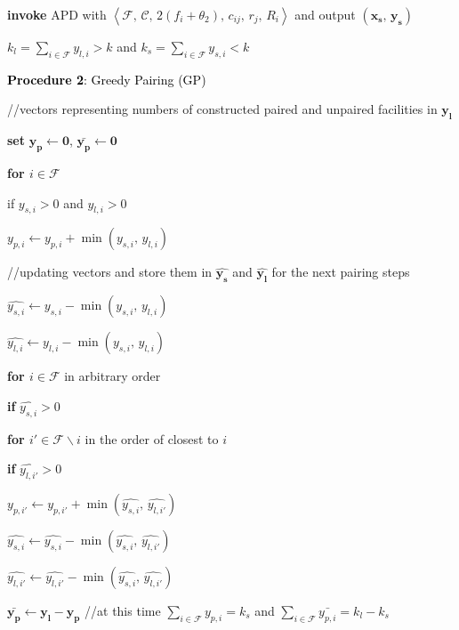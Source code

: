 \documentclass[10pt]{llncs}
\begin{document}
\begin{algorithm}
\textbf{invoke} APD with $\left\langle \mathcal{F},\,\mathcal{C},\,2\left(f_{i}+\theta_{2}\right),\, c_{ij},\, r_{j},\, R_{i}\right\rangle $
and output $\left(\boldsymbol{x_{s}},\,\boldsymbol{y_{s}}\right)$

$k_{l}=\sum_{i\in\mathcal{F}}y_{l,i}>k$ and $k_{s}=\sum_{i\in\mathcal{F}}y_{s,i}<k$

\medskip{}


\textbf{\textcolor{black}{Procedure 2}}\textcolor{black}{: Greedy
Pairing (GP)}

//vectors representing numbers of constructed paired and unpaired
facilities in $\boldsymbol{y_{l}}$

\textbf{set} $\boldsymbol{y_{p}}\leftarrow\boldsymbol{0}$, $\boldsymbol{\bar{y_{p}}}\leftarrow\boldsymbol{0}$ 

\textbf{for $i\in\mathcal{F}$}

\qquad{}if $y_{s,i}>0$ and $y_{l,i}>0$

\qquad{}\qquad{}$y_{p,i}\leftarrow y_{p,i}+\min\left(y_{s,i},\, y_{l,i}\right)$

\qquad{}\qquad{}//updating vectors and store them in $\boldsymbol{\hat{y_{s}}}$
and $\boldsymbol{\hat{y_{l}}}$ for the next pairing steps

\qquad{}\qquad{}$\hat{y_{s,i}}\leftarrow y_{s,i}-\min\left(y_{s,i},\, y_{l,i}\right)$

\qquad{}\qquad{}$\hat{y_{l,i}}\leftarrow y_{l,i}-\min\left(y_{s,i},\, y_{l,i}\right)$

\textbf{for $i\in\mathcal{F}$ }in arbitrary order

\qquad{}\textbf{if} $\hat{y_{s,i}}>0$

\qquad{}\qquad{}\textbf{for $i'\in\mathcal{F}\backslash i$ }in
the order of closest to $i$

\qquad{}\qquad{}\qquad{}\textbf{if} $\hat{y_{l,i'}}>0$

\qquad{}\qquad{}\qquad{}\qquad{}$y_{p,i'}\leftarrow y_{p,i'}+\min\left(\hat{y_{s,i}},\,\hat{y_{l,i'}}\right)$

\qquad{}\qquad{}\qquad{}\qquad{}$\hat{y_{s,i}}\leftarrow\hat{y_{s,i}}-\min\left(\hat{y_{s,i}},\,\hat{y_{l,i'}}\right)$

\qquad{}\qquad{}\qquad{}\qquad{}$\hat{y_{l,i'}}\leftarrow\hat{y_{l,i'}}-\min\left(\hat{y_{s,i}},\,\hat{y_{l,i'}}\right)$

$\boldsymbol{\bar{y_{p}}}\leftarrow\boldsymbol{y_{l}}-\boldsymbol{y_{p}}$
//at this time $\sum_{i\in\mathcal{F}}y_{p,i}=k_{s}$ and $\sum_{i\in\mathcal{F}}\bar{y_{p,i}}=k_{l}-k_{s}$


\end{algorithm}
\end{document}

